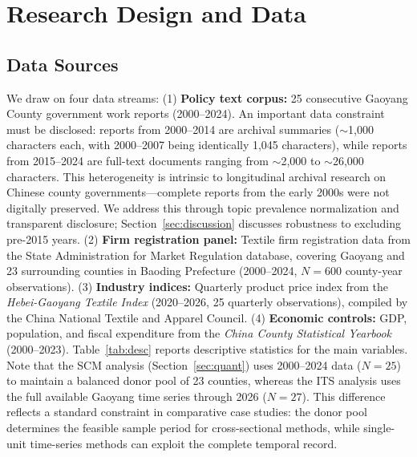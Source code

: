 \documentclass[a4paper, twoside, final]{article}
\begin{document}
\section{Research Design and Data}\label{sec:method}

\subsection{Data Sources}
We draw on four data streams: (1) \textbf{Policy text corpus:} 25 consecutive Gaoyang County government work reports (2000--2024). An important data constraint must be disclosed: reports from 2000--2014 are archival summaries ($\sim$1,000 characters each, with 2000--2007 being identically 1,045 characters), while reports from 2015--2024 are full-text documents ranging from $\sim$2,000 to $\sim$26,000 characters. This heterogeneity is intrinsic to longitudinal archival research on Chinese county governments---complete reports from the early 2000s were not digitally preserved. We address this through topic prevalence normalization and transparent disclosure; Section~\ref{sec:discussion} discusses robustness to excluding pre-2015 years. (2) \textbf{Firm registration panel:} Textile firm registration data from the State Administration for Market Regulation database, covering Gaoyang and 23 surrounding counties in Baoding Prefecture (2000--2024, $N=600$ county-year observations). (3) \textbf{Industry indices:} Quarterly product price index from the \emph{Hebei-Gaoyang Textile Index} (2020--2026, 25 quarterly observations), compiled by the China National Textile and Apparel Council. (4) \textbf{Economic controls:} GDP, population, and fiscal expenditure from the \emph{China County Statistical Yearbook} (2000--2023). Table~\ref{tab:desc} reports descriptive statistics for the main variables. Note that the SCM analysis (Section~\ref{sec:quant}) uses 2000--2024 data ($N=25$) to maintain a balanced donor pool of 23 counties, whereas the ITS analysis uses the full available Gaoyang time series through 2026 ($N=27$). This difference reflects a standard constraint in comparative case studies: the donor pool determines the feasible sample period for cross-sectional methods, while single-unit time-series methods can exploit the complete temporal record.
\end{document}

